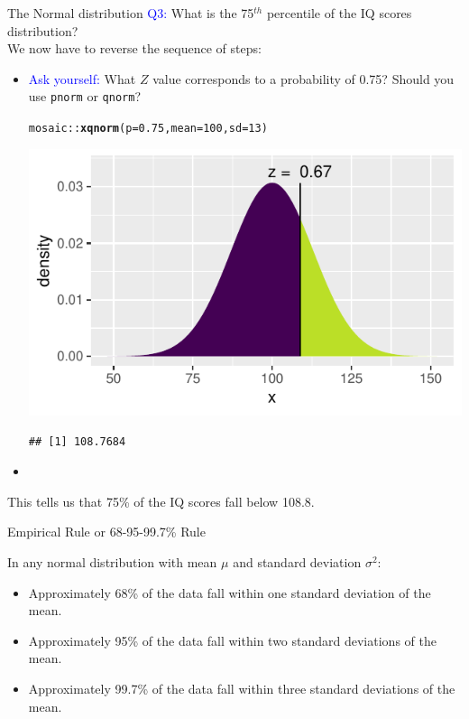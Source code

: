 \documentclass[handout]{beamer}\usepackage[]{graphicx}\usepackage[]{color}
\newcommand{\hlnum}[1]{\textcolor[rgb]{0.686,0.059,0.569}{#1}}%
\newcommand{\hlopt}[1]{\textcolor[rgb]{0,0,0}{#1}}%
\newcommand{\hlstd}[1]{\textcolor[rgb]{0.345,0.345,0.345}{#1}}%
\newcommand{\hlkwc}[1]{\textcolor[rgb]{0.333,0.667,0.333}{#1}}%
\newcommand{\hlkwd}[1]{\textcolor[rgb]{0.737,0.353,0.396}{\textbf{#1}}}%
\newenvironment{knitrout}{}{} %
\begin{document}
\begin{frame}[fragile]{The Normal distribution}
	\textcolor{blue}{Q3:}
	What is the 75$^{th}$ percentile of the IQ scores distribution? \\
	We now have to reverse the sequence of steps: \pause
	\begin{itemize}
		\item \textcolor{blue}{Ask yourself:} What $Z$ value corresponds to a probability of 0.75? Should you use \texttt{pnorm} or \texttt{qnorm}? \pause

\begin{knitrout}\scriptsize
{}\color{fgcolor}
\begin{alltt}
\hlstd{mosaic}\hlopt{::}\hlkwd{xqnorm}\hlstd{(}\hlkwc{p} \hlstd{=} \hlnum{0.75}\hlstd{,} \hlkwc{mean} \hlstd{=} \hlnum{100}\hlstd{,} \hlkwc{sd} \hlstd{=} \hlnum{13}\hlstd{)}
\end{alltt}


{\centering \includegraphics[width=0.6\linewidth]{figure/probs8-1} 

}


\begin{verbatim}
## [1] 108.7684
\end{verbatim}

\end{knitrout}

		\item[]
	\end{itemize} This tells us that 75\% of the IQ scores fall below 108.8. 
\end{frame}


\begin{frame}[fragile]{Empirical Rule or 68-95-99.7\% Rule}

In any normal distribution with mean $\mu$ and standard deviation $\sigma^2$:
\begin{itemize}
			\setlength\itemsep{2em}
	\item Approximately 68\% of the data fall within one standard deviation of the mean.
\item Approximately 95\% of the data fall within two standard deviations of the mean.
\item Approximately 99.7\% of the data fall within three standard deviations of the mean.
\end{itemize}
\end{frame}
\end{document}
